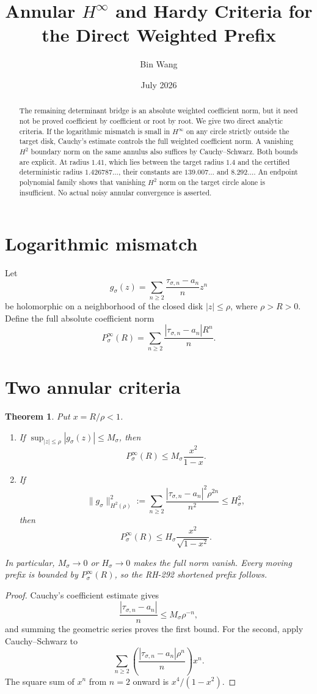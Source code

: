 \documentclass[11pt]{article}
\title{Annular \(H^\infty\) and Hardy Criteria for the Direct Weighted Prefix}
\author{Bin Wang}\date{July 2026}
\newtheorem{theorem}{Theorem}[section]
\theoremstyle{remark}\newtheorem{remark}[theorem]{Remark}
\begin{document}
\maketitle
\begin{abstract}
The remaining determinant bridge is an absolute weighted coefficient norm,
but it need not be proved coefficient by coefficient or root by root.  We
give two direct analytic criteria.  If the logarithmic mismatch is small in
$H^\infty$ on any circle strictly outside the target disk, Cauchy's estimate
controls the full weighted coefficient norm.  A vanishing $H^2$ boundary
norm on the same annulus also suffices by Cauchy--Schwarz.  Both bounds are
explicit.  At radius $1.41$, which lies between the target radius $1.4$ and
the certified deterministic radius $1.426787\ldots$, their constants are
$139.007\ldots$ and $8.292\ldots$.  An endpoint polynomial family shows that
vanishing $H^2$ norm on the target circle alone is insufficient.  No actual
noisy annular convergence is asserted.
\end{abstract}

\section{Logarithmic mismatch}
Let
\[
 g_\sigma(z)=\sum_{n\ge2}
 \frac{\tau_{\sigma,n}-a_n}{n}z^n
\]
be holomorphic on a neighborhood of the closed disk $|z|\le\rho$, where
$\rho>R>0$.  Define the full absolute coefficient norm
\[
 P_\sigma^\infty(R)=\sum_{n\ge2}
 \frac{|\tau_{\sigma,n}-a_n|R^n}{n}.
\]

\section{Two annular criteria}
\begin{theorem}\label{thm:analytic}
Put $x=R/\rho<1$.
\begin{enumerate}
\item If $\sup_{|z|\le\rho}|g_\sigma(z)|\le M_\sigma$, then
\[
 P_\sigma^\infty(R)\le M_\sigma\frac{x^2}{1-x}.
\]
\item If
\[
 \|g_\sigma\|_{H^2(\rho)}^2:=
 \sum_{n\ge2}
 \frac{|\tau_{\sigma,n}-a_n|^2\rho^{2n}}{n^2}
 \le H_\sigma^2,
\]
then
\[
 P_\sigma^\infty(R)\le
 H_\sigma\frac{x^2}{\sqrt{1-x^2}}.
\]
\end{enumerate}
In particular, $M_\sigma\to0$ or $H_\sigma\to0$ makes the full norm vanish.
Every moving prefix is bounded by $P_\sigma^\infty(R)$, so the RH-292
shortened prefix follows.
\end{theorem}
\begin{proof}
Cauchy's coefficient estimate gives
\[
 \frac{|\tau_{\sigma,n}-a_n|}{n}\le M_\sigma\rho^{-n},
\]
and summing the geometric series proves the first bound.  For the second,
apply Cauchy--Schwarz to
\[
 \sum_{n\ge2}
 \left(
 \frac{|\tau_{\sigma,n}-a_n|\rho^n}{n}
 \right)x^n.
\]
The square sum of $x^n$ from $n=2$ onward is $x^4/(1-x^2)$.
\end{proof}
\end{document}
